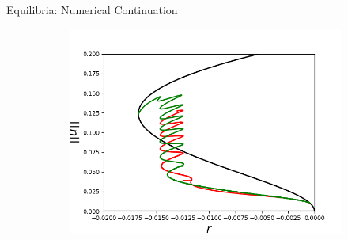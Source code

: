 \documentclass{beamer}
\begin{document}
\begin{frame}{Equilibria: Numerical Continuation}
\begin{figure}[ht]
\begin{subfigure}{\textwidth}
  \centering
  \includegraphics[scale=0.4]
  {Figs/sh_snaking.png}  
\end{subfigure}


\end{figure}
\end{frame}
\end{document}
